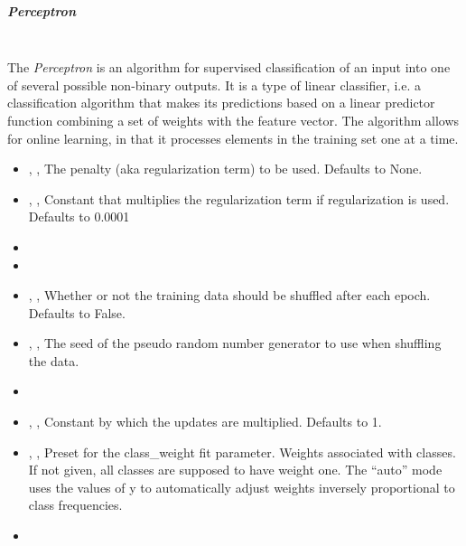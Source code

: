 \subparagraph{Perceptron}
\mbox{}
\\The \textit{Perceptron} is an algorithm for supervised classification of an
input into one of several possible non-binary outputs.
%
It is a type of linear classifier, i.e. a classification algorithm that makes
its predictions based on a linear predictor function combining a set of weights
with the feature vector.
%
The algorithm allows for online learning, in that it processes elements in the
training set one at a time.
%
\begin{itemize}
  \item {} , ,
  The penalty (aka regularization term) to be used.
  Defaults to None.
  \item {} , ,
  Constant that multiplies the regularization term if regularization is used.
  Defaults to 0.0001
  \item {}
  \item {}
  \item {} , ,
  Whether or not the training data should be shuffled after each epoch.
  Defaults to False.
  \item {} , ,
  The seed of the pseudo random number generator to use when shuffling the data.
  \item \verDescriptionB
  \item {} , ,
  Constant by which the updates are multiplied.
  Defaults to 1.
  \item {} , ,
  Preset for the class\_weight fit parameter.
  Weights associated with classes.
  If not given, all classes are supposed to have weight one.
  The “auto” mode uses the values of y to automatically adjust weights
  inversely proportional to class frequencies.
  \item \warmStartDescription{}
\end{itemize}

